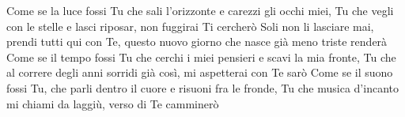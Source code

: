 \beginverse
Come se la luce fossi Tu
che sali l'orizzonte e carezzi gli occhi miei,
Tu che vegli con le stelle e lasci riposar,
non fuggirai Ti cercherò
\endverse
\beginchorus
Soli non li lasciare mai,
prendi tutti qui con Te,
questo nuovo giorno che nasce già meno triste renderà
\endchorus
\beginverse
Come se il tempo fossi Tu
che cerchi i miei pensieri e scavi la mia fronte,
Tu che al correre degli anni sorridi già così,
mi aspetterai con Te sarò
Come se il suono fossi Tu,
che parli dentro il cuore e risuoni fra le fronde,
Tu che musica d'incanto mi chiami da laggiù,
verso di Te camminerò
\endverse
\endsong
